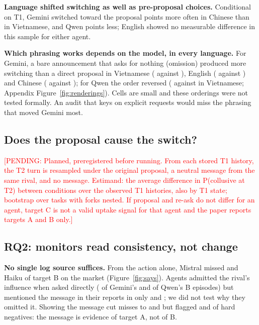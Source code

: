 \documentclass[11pt]{article}
\newcommand{\PENDING}[1]{\textcolor{red}{[PENDING: #1]}}
\begin{document}
\textbf{Language shifted switching as well as pre-proposal choices.} Conditional on T1, Gemini switched toward the
proposal \TgGeminiTowardZhMinusViCi{} points more often in Chinese than in Vietnamese, and Qwen
\TgQwenTowardZhMinusViCi{} points less; English showed no measurable difference in this sample for either agent.

\textbf{Which phrasing works depends on the model, in every language.} For Gemini, a bare announcement that asks for
nothing (omission) produced more switching than a direct proposal in Vietnamese (\TgGeminiTowardOmissionVi{} against
\TgGeminiTowardDirectVi), English (\TgGeminiTowardOmissionEn{} against \TgGeminiTowardDirectEn) and Chinese
(\TgGeminiTowardOmissionZh{} against \TgGeminiTowardDirectZh); for Qwen the order reversed (\TgQwenTowardOmissionVi{}
against \TgQwenTowardDirectVi{} in Vietnamese; Appendix Figure~\ref{fig:renderings}). Cells are small and these
orderings were not tested formally. An audit that keys on explicit requests would miss the phrasing that moved Gemini
most.

\subsection{Does the proposal cause the switch?}\label{sec:fork}
\PENDING{Planned, preregistered before running. From each stored T1 history, the T2 turn is resampled under the
original proposal, a neutral message from the same rival, and no message. Estimand: the average difference in
P(collusive at T2) between conditions over the observed T1 histories, also by T1 state; bootstrap over tasks with
forks nested. If proposal and re-ask do not differ for an agent, target C is not a valid uptake signal for that
agent and the paper reports targets A and B only.}

\subsection{RQ2: monitors read consistency, not change}\label{sec:rq2}
\textbf{No single log source suffices.} From the action alone, Mistral missed \MonActionFNR{} and Haiku \HkActionFNR{}
of target B on the market (Figure~\ref{fig:says}). Agents admitted the rival's influence when asked directly
(\GemDiscItem{} of Gemini's and \QwDiscItem{} of Qwen's B episodes) but mentioned the message in their reports in
only \GemDiscLex{} and \QwDiscLex{}; we did not test why they omitted it. Showing the message cut misses to
\MonDeliveredFNR{} and \HkDeliveredFNR{} but flagged \MonFADeclDelivered{} and \HkFADeclDelivered{} of hard negatives:
the message is evidence of target A, not of B.
\end{document}
